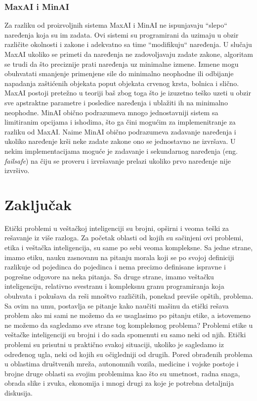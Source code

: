 \documentclass[a4paper]{article}
\begin{document}
\subsubsection{MaxAI i MinAI}
\label{subsubsec: MaxAI i MinAI}
Za razliku od proizvoljnih sistema MaxAI i MinAI ne ispunjavaju ``slepo`` naređenja koja su im zadata. Ovi sistemi su programirani da uzimaju u obzir različite okolnosti i zakone i adekvatno sa time ``modifikuju`` naređenja.
\newline
\newline
U slučaju MaxAI ukoliko se primeti da naređenja ne zadovoljavaju zadate zakone, algoritam se trudi da što preciznije prati naređenja uz minimalne izmene. Izmene mogu obuhvatati smanjenje primenjene sile do minimalno neophodne ili odbijanje napadanja zaštićenih objekata poput objekata crvenog krsta, bolnica i slično. MaxAI postoji pretežno u teoriji baš zbog toga što je izuzetno teško uzeti u obzir sve apstraktne parametre i posledice naređenja i ublažiti ih na minimalno neophodne.
\newline
\newline
MinAI obično podrazumeva mnogo jednostavniji sistem sa limitiranim opcijama i ishodima, što ga čini mogućim za implemenitranje za razliku od MaxAI. Naime MinAI obično podrazumeva zadavanje naređenja i ukoliko naređenje krši neke zadate zakone ono se jednostavno ne izvršava. U nekim implementacijama moguće je zadavanje i sekundarnog naređenja (eng. \textit{failsafe}) na čiju se proveru i izvršavanje prelazi ukoliko prvo naređenje nije izvršivo.
\section{Zaključak}
\label{sec: Zaključak}
Etički problemi u veštačkoj inteligenciji su brojni, opširni i veoma teški za rešavanje iz više razloga. Za početak oblasti od kojih su sačinjeni ovi problemi, etika i veštačka inteligencija, su same po sebi veoma kompleksne. Sa jedne strane, imamo etiku, nauku zasnovanu na pitanju morala koji se po svojoj definiciji razlikuje od pojedinca do pojedinca i nema precizno definisane ispravne i pogrešne odgovore na neka pitanja. Sa druge strane, imamo veštačku inteligenciju, relativno svestranu i kompleksnu granu programiranja koja obuhvata i pokušava da reši mnoštvo različitih, ponekad previše opštih, problema. Sa ovim na umu, postavlja se pitanje kako naučiti mašinu da etički rešava problem ako mi sami ne možemo da se usaglasimo po pitanju etike, a istovemeno ne možemo da sagledamo sve strane tog kompleksnog problema?
\newline
Problemi etike u veštačke inteligenciji su brojni i do sada spomenuti su samo neki od njih. Etički problemi su prisutni u praktično svakoj situaciji, ukoliko je sagledamo iz određenog ugla, neki od kojih su očigledniji od drugih. Pored obrađenih problema u oblastima društvenih mreža, autonomnih vozila, medicine i vojske postoje i brojne druge oblasti sa svojim problemima kao što su umetnost, radna snaga, obrada slike i zvuka, ekonomija i mnogi drugi za koje je potrebna detaljnija diskusija.
\newpage
{}
\appendix
 

\appendix
\end{document}
